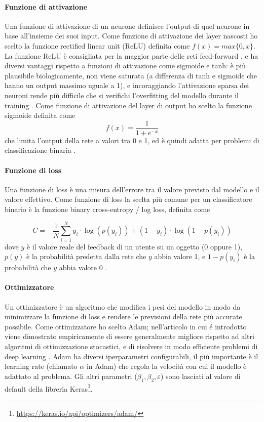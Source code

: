 \documentclass[12pt,italian]{report}
\begin{document}
\paragraph{Funzione di attivazione}
Una funzione di attivazione di un neurone definisce l'output di quel neurone in base all'insieme dei suoi input. Come funzione di attivazione dei layer nascosti ho scelto la funzione rectified linear unit (ReLU) definita come $f(x) = max\{0, x\}$. La funzione ReLU è consigliata per la maggior parte delle reti feed-forward \cite{Goodfellow-et-al-2016}, e ha diversi vantaggi rispetto a funzioni di attivazione come sigmoide e tanh: è più plausibile biologicamente, non viene saturata (a differenza di tanh e sigmoide che hanno un output massimo uguale a 1), e incoraggiando l'attivazione sparsa dei neuroni rende più difficile che si verifichi l'overfitting del modello durante il training \cite{relu}. Come funzione di attivazione del layer di output ho scelto la funzione sigmoide definita come 
$$f
(x) = \frac{1}{1+e^{-x}}
$$
che limita l'output della rete a valori tra 0 e 1, ed è quindi adatta per problemi di classificazione binaria \cite{choose-act-func}. 
\paragraph{Funzione di loss}
Una funzione di loss è una misura dell'errore tra il valore previsto dal modello e il valore effettivo. Come funzione di loss la scelta più comune per un classificatore binario è la funzione binary cross-entropy / log loss, definita come

$$
C = -\frac{1}{N} \sum_{i=1}^N y_i \cdot \log(p(y_i)) + (1-y_i) \cdot \log(1-p(y_i))
$$
dove $y$ è il valore reale del feedback di un utente su un oggetto (0 oppure 1), $p(y)$ è la probabilità predetta dalla rete che $y$ abbia valore 1, e $1-p(y_i)$ è la probabilità che $y$ abbia valore 0 \cite{cross-entropy}.

\paragraph{Ottimizzatore}
Un ottimizzatore è un algoritmo che modifica i pesi del modello in modo da minimizzare la funzione di loss e rendere le previsioni della rete più accurate possibile. Come ottimizzatore ho scelto Adam; nell'articolo in cui é introdotto viene dimostrato empiricamente di essere generalmente migliore rispetto ad altri algoritmi di ottimizzazione stocastici, e di risolvere in modo efficiente problemi di deep learning \cite{adam}. Adam ha diversi iperparametri configurabili, il più importante è il learning rate (chiamato $\alpha$ in Adam) che regola la velocità con cui il modello è adattato al problema. Gli altri parametri ($\beta_1, \beta_2, \varepsilon$) sono lasciati al valore di default della libreria Keras\footnote{\url{https://keras.io/api/optimizers/adam/}}. 
\end{document}
